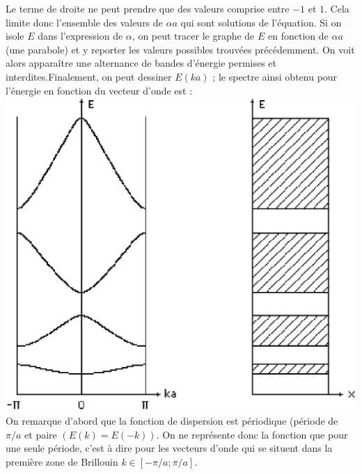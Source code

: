 Le terme de droite ne peut prendre que des valeurs comprise entre $-1$ et $1$. Cela limite donc l'ensemble des valeurs de $\alpha a$ qui sont solutions de l'équation.
Si on isole $E$ dans l'expression de $\alpha$, on peut tracer le graphe de $E$ en fonction de $\alpha a$ (une parabole) et y reporter les valeurs possibles trouvées précédemment. On voit alors apparaître une alternance de bandes d'énergie permises et interdites.Finalement, on peut dessiner $E(ka)$ ; le spectre ainsi obtenu pour l'énergie en fonction du vecteur d'onde est :
\\\includegraphics[scale=0.4]{disp.eps} \\
On remarque d'abord que la fonction de dispersion est périodique (période de $\pi/a$ et paire $(E(k)=E(-k))$. On ne représente donc la fonction que pour une seule période, c'est à dire pour les vecteurs d'onde qui se situent dans la première zone de Brillouin $k \in [-\pi/a ; \pi/a]$.%

